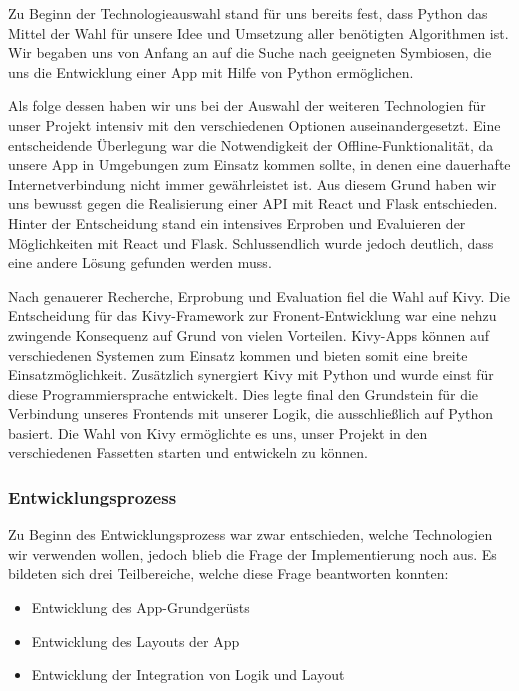 		Zu Beginn der Technologieauswahl stand für uns bereits fest, dass Python das Mittel der Wahl für unsere Idee und Umsetzung aller benötigten Algorithmen ist. Wir begaben uns von Anfang an auf die Suche nach geeigneten Symbiosen, die uns die Entwicklung einer App mit Hilfe von Python ermöglichen.

		Als folge dessen haben wir uns bei der Auswahl der weiteren Technologien für unser Projekt intensiv mit den verschiedenen Optionen auseinandergesetzt. Eine entscheidende Überlegung war die Notwendigkeit der Offline-Funktionalität, da unsere App in Umgebungen zum Einsatz kommen sollte, in denen eine dauerhafte Internetverbindung nicht immer gewährleistet ist. Aus diesem Grund haben wir uns bewusst gegen die Realisierung einer API mit React und Flask entschieden. Hinter der Entscheidung stand ein intensives Erproben und Evaluieren der Möglichkeiten mit React und Flask. Schlussendlich wurde jedoch deutlich, dass eine andere Lösung gefunden werden muss.

		Nach genauerer Recherche, Erprobung und Evaluation fiel die Wahl auf Kivy. Die Entscheidung für das Kivy-Framework zur Fronent-Entwicklung war eine nehzu zwingende Konsequenz auf Grund von vielen Vorteilen. Kivy-Apps können auf verschiedenen Systemen zum Einsatz kommen und bieten somit eine breite Einsatzmöglichkeit. Zusätzlich synergiert Kivy mit Python und wurde einst für diese Programmiersprache entwickelt. Dies legte final den Grundstein für die Verbindung unseres Frontends mit unserer Logik, die ausschließlich auf Python basiert. Die Wahl von Kivy ermöglichte es uns, unser Projekt in den verschiedenen Fassetten starten und entwickeln zu können.
		
	\subsubsection{Entwicklungsprozess}
	\label{sssec:entwicklung}
		
		Zu Beginn des Entwicklungsprozess war zwar entschieden, welche Technologien wir verwenden wollen, jedoch blieb die Frage der Implementierung noch aus. Es bildeten sich drei Teilbereiche, welche diese Frage beantworten konnten:
		\begin{itemize}
			\item Entwicklung des App-Grundgerüsts
			\item Entwicklung des Layouts der App
			\item Entwicklung der Integration von Logik und Layout
		\end{itemize}
		
